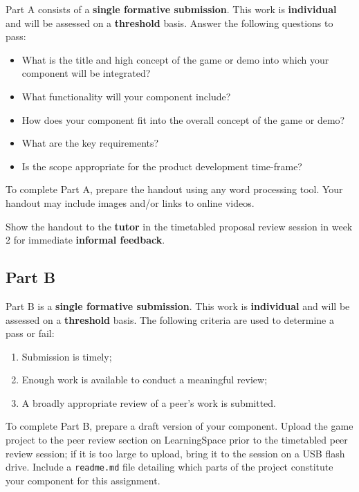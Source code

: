 \documentclass{../../fal_assignment}
\begin{document}
Part A consists of a \textbf{single formative submission}. This work is \textbf{individual} and will be assessed on a \textbf{threshold} basis. Answer the following questions to pass:

\begin{itemize}
	\item What is the title and high concept of the game or demo into which your component will be integrated?
	\item What functionality will your component include?
	\item How does your component fit into the overall concept of the game or demo?
	\item What are the key requirements?
	\item Is the scope appropriate for the product development time-frame?
\end{itemize}

To complete Part A, prepare the handout using any word processing tool.
Your handout may include images and/or links to online videos.

Show the handout to the \textbf{tutor} in the timetabled proposal review session in week 2 for immediate \textbf{informal feedback}.

\subsection*{Part B}

Part B is a \textbf{single formative submission}. This work is \textbf{individual} and will be assessed on a \textbf{threshold} basis. The following criteria are used to determine a pass or fail:

\begin{enumerate}[label=(\alph*)]
	\item Submission is timely;
	\item Enough work is available to conduct a meaningful review;
	\item A broadly appropriate review of a peer's work is submitted.
\end{enumerate}

To complete Part B, prepare a draft version of your component.
Upload the game project to the peer review section on LearningSpace prior to the timetabled peer review session;
if it is too large to upload, bring it to the session on a USB flash drive.
Include a \texttt{readme.md} file detailing which parts of the project constitute your component for this assignment.
\end{document}
